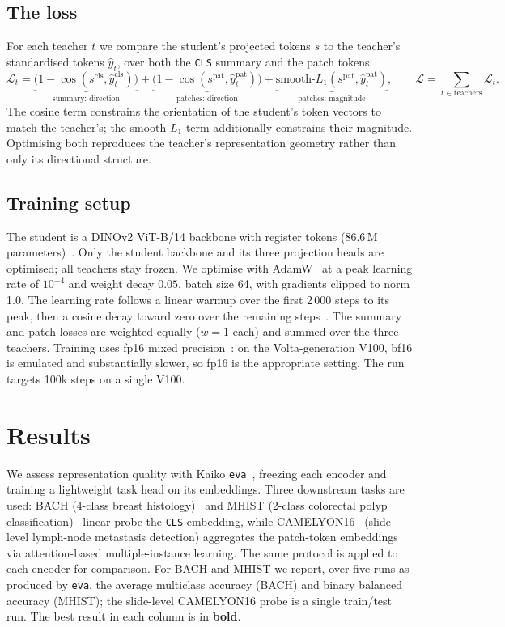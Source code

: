 \documentclass[10pt]{article}
\begin{document}
\subsection{The loss}

For each teacher $t$ we compare the student's projected tokens $s$ to the teacher's standardised
tokens $\hat y_t$, over both the \texttt{CLS} summary and the patch tokens:
\[
\mathcal{L}_t=\underbrace{\big(1-\cos(s^{\text{cls}},\hat y_t^{\text{cls}})\big)}_{\text{summary: direction}}
+\underbrace{\big(1-\cos(s^{\text{pat}},\hat y_t^{\text{pat}})\big)}_{\text{patches: direction}}
+\underbrace{\text{smooth-}L_1(s^{\text{pat}},\hat y_t^{\text{pat}})}_{\text{patches: magnitude}},
\qquad
\mathcal{L}=\!\!\sum_{t\in\text{teachers}}\!\!\mathcal{L}_t .
\]
The cosine term constrains the orientation of the student's token vectors to match the teacher's;
the smooth-$L_1$ term additionally constrains their magnitude. Optimising both reproduces the
teacher's representation geometry rather than only its directional structure.

\subsection{Training setup}

The student is a DINOv2 ViT-B/14 backbone with register tokens (86.6\,M parameters)~\cite{dinov2}.
Only the student backbone and its three projection heads are optimised; all teachers stay frozen.
We optimise with AdamW~\cite{adamw} at a peak learning rate of $10^{-4}$ and weight decay $0.05$,
batch size 64, with gradients clipped to norm 1.0. The learning rate follows a linear warmup over
the first 2\,000 steps to its peak, then a cosine decay toward zero over the remaining
steps~\cite{sgdr}. The summary and patch losses are weighted equally ($w=1$ each) and summed over
the three teachers. Training uses fp16 mixed precision~\cite{amp}: on the Volta-generation V100,
bf16 is emulated and substantially slower, so fp16 is the appropriate setting. The run targets
100k steps on a single V100.

\section{Results}

We assess representation quality with Kaiko \texttt{eva}~\cite{eva}, freezing each encoder and
training a lightweight task head on its embeddings. Three downstream tasks are used: BACH (4-class
breast histology)~\cite{bach} and MHIST (2-class colorectal polyp classification)~\cite{mhist}
linear-probe the \texttt{CLS} embedding, while CAMELYON16~\cite{camelyon16} (slide-level lymph-node
metastasis detection) aggregates the patch-token embeddings via attention-based multiple-instance
learning. The same protocol is applied to each encoder for comparison. For BACH and MHIST we report, over
five runs as produced by \texttt{eva}, the average multiclass accuracy (BACH) and binary balanced
accuracy (MHIST); the slide-level CAMELYON16 probe is a single train/test run. The best result in
each column is in \textbf{bold}.
\end{document}
